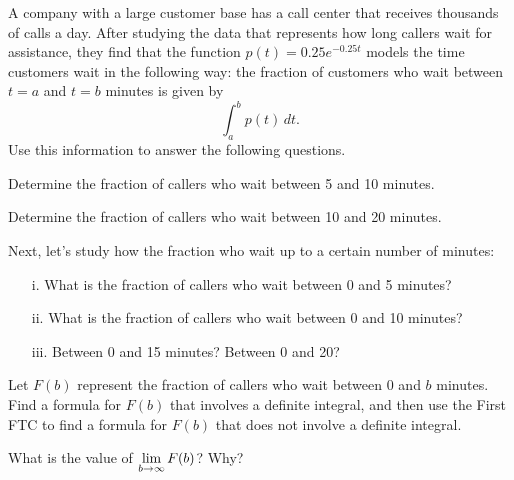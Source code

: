 \begin{pa} \label{PA:6.5}  A company with a large customer base has a call center that receives thousands of calls a day.  After studying the data that represents how long callers wait for assistance, they find that the function $p(t) = 0.25e^{-0.25t}$ models the time customers wait in the following way:  the fraction of customers who wait between $t = a$ and $t = b$ minutes is given by
$$\int_a^b p(t) \, dt.$$  
Use this information to answer the following questions.
\ba
	\item Determine the fraction of callers who wait between 5 and 10 minutes.
	\item Determine the fraction of callers who wait between 10 and 20 minutes.
	\item Next, let's study how the fraction who wait up to a certain number of minutes:
	\begin{itemize}
		\item[i.] What is the fraction of callers who wait between 0 and 5 minutes?
		\item[ii.] What is the fraction of callers who wait between 0 and 10 minutes?
		\item[iii.] Between 0 and 15 minutes?  Between 0 and 20? 
	\end{itemize}
	\item Let $F(b)$ represent the fraction of callers who wait between $0$ and $b$ minutes.  Find a formula for $F(b)$ that involves a definite integral, and then use the First FTC to find a formula for $F(b)$ that does not involve a definite integral.
	\item What is the value of $\displaystyle \lim_{b \to \infty} F(b)$?  Why?
\ea
\end{pa} 
\afterpa